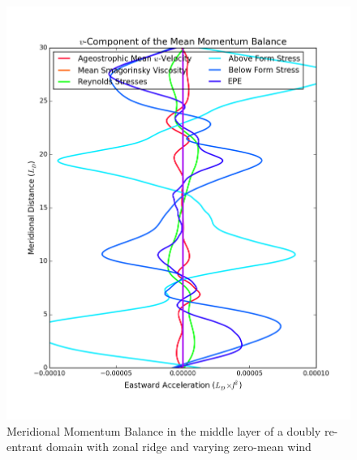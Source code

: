 \documentclass[12pt,a4paper]{report}
\begin{document}
\begin{figure}
\begin{minipage}[b]{0.45\linewidth}
 		\includegraphics[width=\linewidth ]{vmom_2}
 		\caption{Meridional Momentum Balance in the middle layer of 
 			a doubly re-entrant domain with 
 			zonal ridge and varying zero-mean wind}
 		\label{fig:vmomlayer2}
 	\end{minipage}
 \end{figure}
 
\end{document}
